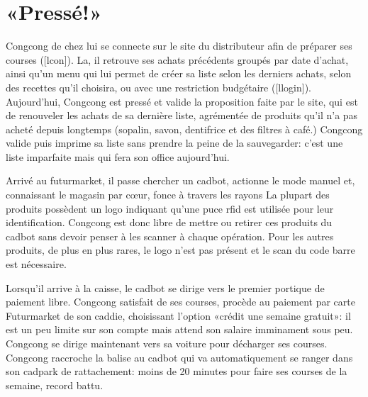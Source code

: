 \section{«Pressé!»}

Congcong de chez lui se connecte sur le site du distributeur afin de préparer ses courses ([lcon]).
La, il retrouve ses achats précédents groupés par date d'achat, ainsi qu'un menu qui lui permet de créer sa liste selon les derniers achats, selon des recettes qu'il choisira, ou avec une restriction budgétaire ([llogin]). 
Aujourd'hui, Congcong est pressé et valide la proposition faite par le site, qui est de renouveler les achats de sa dernière liste, agrémentée de produits qu'il n'a pas acheté depuis longtemps (sopalin, savon, dentifrice et des filtres à café.)
Congcong valide puis imprime sa liste sans prendre la peine de la sauvegarder: c'est une liste imparfaite mais qui fera son office aujourd'hui.
\par
Arrivé au futurmarket, il passe chercher un cadbot, actionne le mode manuel et, connaissant le magasin par cœur, fonce à travers les rayons 
La plupart des produits possèdent un logo indiquant qu'une puce rfid est utilisée pour leur identification.
Congcong est donc libre de mettre ou retirer ces produits du cadbot sans devoir penser à les scanner à chaque opération.
Pour les autres produits, de plus en plus rares, le logo n'est pas présent et le scan du code barre est nécessaire.
\par
Lorsqu'il arrive à la caisse, le cadbot se dirige vers le premier portique de paiement libre.
Congcong satisfait de ses courses, procède au paiement par carte Futurmarket de son caddie, choisissant l'option «crédit une semaine gratuit»: il est un peu limite sur son compte mais attend son salaire imminament sous peu.
Congcong se dirige maintenant vers sa voiture pour décharger ses courses.
Congcong raccroche la balise au cadbot qui va automatiquement se ranger dans son cadpark de rattachement: moins de 20 minutes pour faire ses courses de la semaine, record battu.

